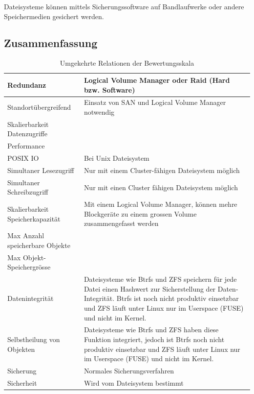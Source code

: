Dateisysteme können mittels Sicherungssoftware auf Bandlaufwerke oder andere Speichermedien gesichert werden.


\subsection{Zusammenfassung}

\begin{table}[htbp]
\caption{Umgekehrte Relationen der Bewertungsskala}
\begin{tabular}{|L{3.5cm}|L{10cm}|}
\hline
Redundanz & Logical Volume Manager oder Raid (Hard bzw. Software) \\ \hline
Standortübergreifend & Einsatz von SAN und Logical Volume Manager notwendig \\ \hline
Skalierbarkeit Datenzugriffe &  \\ \hline
Performance &  \\ \hline
POSIX IO & Bei Unix Dateisystem \\ \hline
Simultaner Lesezugriff & Nur mit einem Cluster-fähigen Dateisystem möglich \\ \hline
Simultaner Schreibzugriff & Nur mit einen Cluster fähigen Dateisystem möglich \\ \hline
Skalierbarkeit Speicherkapazität & Mit einem Logical Volume Manager, können mehre Blockgeräte zu einem grossen Volume zusammengefasst werden \\ \hline
Max Anzahl speicherbare Objekte &  \\ \hline
Max Objekt-Speichergrösse &  \\ \hline
Datenintegrität & Dateisysteme wie Btrfs und ZFS speichern für jede Datei einen Hashwert zur Sicherstellung der Daten-Integrität. Btrfs ist noch nicht produktiv einsetzbar und ZFS läuft unter Linux nur im Userspace (FUSE) und nicht im Kernel. \\ \hline
Selbstheilung von Objekten & Dateisysteme wie Btrfs und ZFS haben diese Funktion integriert, jedoch ist Btrfs noch nicht produktiv einsetzbar und ZFS läuft unter Linux nur im Userspace (FUSE) und nicht im Kernel. \\ \hline
Sicherung & Normales Sicherungsverfahren \\ \hline
Sicherheit & Wird vom Dateisystem bestimmt \\ \hline
\end{tabular}
\label{Umgekehrte Bewertungsskala}
\end{table}

